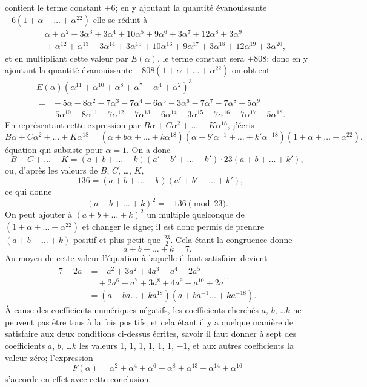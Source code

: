 \documentclass[11pt,a4paper]{article}
\begin{document}
contient le terme constant $+6$; en y ajoutant la quantité évanouissante $-6(1 + \alpha + \ldots + \alpha^{22})$ elle se réduit à
\[
\begin{aligned}
&\;\;\;\;\alpha + \alpha^{2} - 3\alpha^{3} + 3\alpha^{4} + 10\alpha^{5} + 9\alpha^{6} + 3\alpha^{7} + 12\alpha^{8} + 3\alpha^{9} \\
&\;\;\;\;{}+ \alpha^{12} + \alpha^{13} - 3\alpha^{14} + 3\alpha^{15} + 10\alpha^{16} + 9\alpha^{17} + 3\alpha^{18} + 12\alpha^{19} + 3\alpha^{20},
\end{aligned}
\]
et en multipliant cette valeur par $E(\alpha)$, le terme constant sera $+808$; donc en y ajoutant la quantité évanouissante $-808(1+\alpha+\ldots+\alpha^{22})$ on obtient
\[
\begin{aligned}
&E(\alpha)(\alpha^{11} + \alpha^{10} + \alpha^{8} + \alpha^{7} + \alpha^{4} + \alpha^{2})^{3} \\
&= \;\; -5\alpha - 8\alpha^{2} - 7\alpha^{3} - 7\alpha^{4} - 6\alpha^{5} - 3\alpha^{6} - 7\alpha^{7} - 7\alpha^{8} - 5\alpha^{9} \\
&\quad{}- 5\alpha^{10} - 8\alpha^{11} - 7\alpha^{12} - 7\alpha^{13} - 6\alpha^{14} - 3\alpha^{15} - 7\alpha^{16} - 7\alpha^{17} - 5\alpha^{18}.
\end{aligned}
\]
En représentant cette expression par $B\alpha + C\alpha^{2} + \ldots + K\alpha^{18}$, j'écris
\[
B\alpha + C\alpha^{2} + \ldots + K\alpha^{18}
= (\alpha + b\alpha + \ldots + k\alpha^{18})(\alpha + b'\alpha^{-1} + \ldots + k'\alpha^{-18})(1 + \alpha + \ldots + \alpha^{22}),
\]
équation qui subsiste pour $\alpha = 1$. On a donc
\[
B + C + \ldots + K = (a + b + \ldots + k)(a' + b' + \ldots + k') \cdot 23 (a + b + \ldots + k'),
\]
ou, d'après les valeurs de $B$, $C$, \ldots, $K$,
\[
-136 = (a + b + \ldots + k)(a' + b' + \ldots + k'),
\]
ce qui donne
\[
(a + b + \ldots + k)^{2} = -136 \pmod{23}.
\]
On peut ajouter à $(a + b + \ldots + k)^{2}$ un multiple quelconque de $(1 + \alpha + \ldots + \alpha^{22})$ et changer le signe; il est donc permis de prendre $(a + b + \ldots + k)$ positif et plus petit que $\frac{23}{2}$. Cela étant la congruence donne
\[
a + b + \ldots + k = 7.
\]
Au moyen de cette valeur l'équation à laquelle il faut satisfaire devient
\[
\begin{aligned}
7 + 2a &= -a^{2} + 3a^{2} + 4a^{3} - a^{4} + 2a^{5} \\
&\quad{}+ 2a^{6} - a^{7} + 3a^{8} + 4a^{9} - a^{10} + 2a^{11} \\
&= (a + b a \ldots + k a^{18})(a + b a^{-1} \ldots + k a^{-18}).
\end{aligned}
\]
À cause des coefficients numériques négatifs, les coefficients cherchés $a$, $b$, \ldots $k$ ne peuvent pas être tous à la fois positifs; et cela étant il y a quelque manière de satisfaire aux deux conditions ci-dessus écrites, savoir il faut donner à sept des coefficients $a$, $b$, \ldots $k$ les valeurs 1, 1, 1, 1, 1, 1, $-1$, et aux autres coefficients la valeur zéro; l'expression
\[
F(\alpha) = \alpha^{2} + \alpha^{4} + \alpha^{6} + \alpha^{8} + \alpha^{13} - \alpha^{14} + \alpha^{16}
\]
s'accorde en effet avec cette conclusion.
\end{document}
